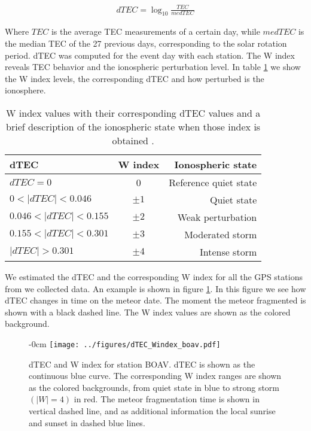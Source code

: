 \begin{align}
    dTEC = \log_{10}\frac{TEC}{medTEC}
\end{align}

Where $TEC$ is the average TEC measurements of a certain day, while $medTEC$ is the median TEC of the 27 previous days, corresponding to the solar rotation period. dTEC was computed for the event day with each station. The W index reveals TEC behavior and the ionospheric perturbation level. In table \ref{tab:W-index} we show the W index levels, the corresponding dTEC and how perturbed is the ionosphere. %

\begin{table}
    \centering
    \caption{W index values with their corresponding dTEC values and a brief description of the ionospheric state when those index is obtained \citep{Gulyaeva:2008}.}
    \begin{tabular}{lcr}\toprule
    dTEC & W index   & Ionospheric state     \\
    \hline
    $dTEC = 0$ & 0   & Reference quiet state \\
    $0<|dTEC|<0.046$ & $\pm 1$ & Quiet state \\
    $0.046<|dTEC|<0.155$ & $\pm 2$ & Weak perturbation \\
    $0.155<|dTEC|<0.301$ & $\pm 3$ & Moderated storm   \\
    $|dTEC|> 0.301$  & $\pm 4$ & Intense storm         \\\bottomrule
    \end{tabular}
    \label{tab:W-index}
\end{table}

We estimated the dTEC and the corresponding W index for all the GPS stations from we collected data. An example is shown in figure \ref{fig:dtec-boav}. In this figure we see how dTEC changes in time on the meteor date. The moment the meteor fragmented is shown with a black dashed line. The W index values are shown as the colored background.

\begin{figure}
    \centering
    \begin{adjustwidth}{-\extralength}{0cm}
    \texttt{[image: ../figures/dTEC\_Windex\_boav.pdf]}
    \end{adjustwidth}
    \caption{dTEC and W index for station BOAV. dTEC is shown as the continuous blue curve. The corresponding W index ranges are shown as the colored backgrounds, from quiet state in blue to strong storm $(|W|=4)$ in red. The meteor fragmentation time is shown in vertical dashed line, and  as additional information the local sunrise and sunset in dashed blue lines.}
    \label{fig:dtec-boav}
\end{figure}

